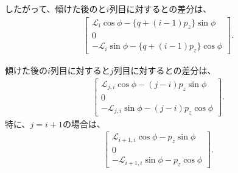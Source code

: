 したがって、傾けた後の\TopCurvatureCenter と$i$列目に対する\CurvatureCenter との差分は、
\begin{align}
  \label{eq:afterPhidimpleCenterDistance}
  \left[
  \begin{array}{c}
    \mathcal L_i\cos\phi-\{q+(i-1)p_z\}\sin\phi\\
    0\\
    -\mathcal L_i\sin\phi-\{q+(i-1)p_z\}\cos\phi
  \end{array}
  \right].
\end{align}
\begin{hosoku}
傾けた後の$i$列目に対する\CurvatureCenter と$j$列目に対する\CurvatureCenter との差分は、
\begin{align*}
  \left[
  \begin{array}{c}
    \mathcal L_{j,i}\cos\phi-(j-i)p_z\sin\phi\\
    0\\
    -\mathcal L_{j,i}\sin\phi-(j-i)p_z\cos\phi
  \end{array}
  \right].
\end{align*}
特に、$j = i+1$の場合は、
\begin{align*}
  \left[
  \begin{array}{c}
    \mathcal L_{i+1,i}\cos\phi-p_z\sin\phi\\
    0\\
    -\mathcal L_{i+1,i}\sin\phi-p_z\cos\phi
  \end{array}
  \right].
\end{align*}
\end{hosoku}

